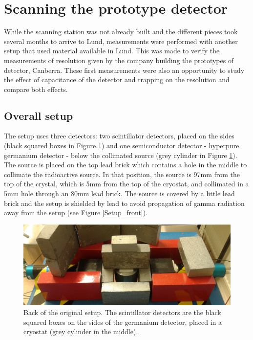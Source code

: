 \documentclass[11pt,a4paper]{article}
\begin{document}
\section{Scanning the prototype detector}

While the scanning station was not already built and the different pieces took several months to arrive to Lund, measurements were performed with another setup that used material available in Lund. This was made to verify the measurements of resolution given by the company building the prototypes of detector, Canberra. These first measurements were also an opportunity to study the effect of capacitance of the detector and trapping on the resolution and compare both effects.

\subsection{Overall setup} \label{setup}

The setup uses three detectors: two scintillator detectors, placed on the sides (black squared boxes in Figure \ref{Setup}) and one semiconductor detector - hyperpure germanium detector - below the collimated source (grey cylinder in Figure \ref{Setup}). The source is placed on the top lead brick which contains a hole in the middle to collimate the radioactive source. In that position, the source is 97mm from the top of the crystal, which is 5mm from the top of the cryostat, and collimated in a 5mm hole through an 80mm lead brick. The source is covered by a little lead brick and the setup is shielded by lead to avoid propagation of gamma radiation away from the setup (see Figure \ref{Setup_front}).

\begin{figure}[!h]
\centering
\includegraphics[scale=0.15]{New_setup_back.jpg}
\caption{Back of the original setup. The scintillator detectors are the black squared boxes on the sides of the germanium detector, placed in a cryostat (grey cylinder in the middle).}
\label{Setup}
\end{figure}
\end{document}
